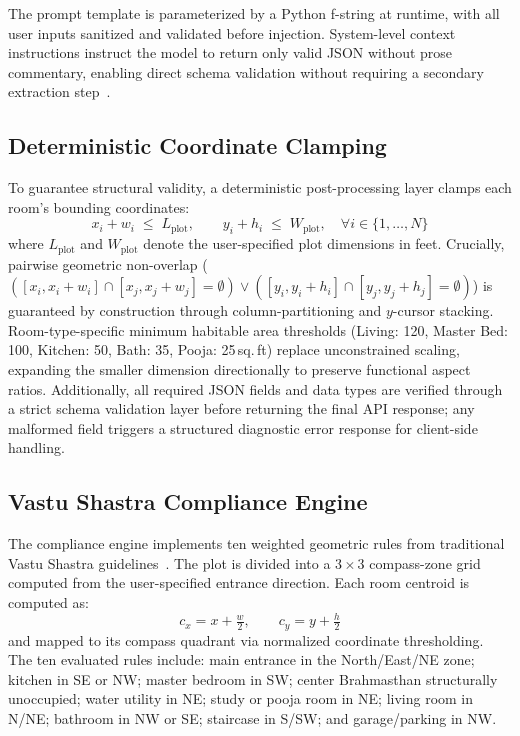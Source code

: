 \documentclass[10pt, twocolumn, letterpaper]{article}
\begin{document}
The prompt template is parameterized by a Python f-string at runtime, with
all user inputs sanitized and validated before injection. System-level context
instructions instruct the model to return only valid JSON without prose
commentary, enabling direct schema validation without requiring a secondary
extraction step~\cite{efficient_guided_gen}.

\subsection{Deterministic Coordinate Clamping}

To guarantee structural validity, a deterministic post-processing layer clamps each room's bounding coordinates:
\begin{equation}
  x_i + w_i \;\leq\; L_{\text{plot}}, \qquad y_i + h_i \;\leq\; W_{\text{plot}}, \quad \forall i \in \{1, \dots, N\}
\end{equation}
where $L_{\text{plot}}$ and $W_{\text{plot}}$ denote the user-specified plot dimensions in feet. Crucially, pairwise geometric non-overlap ($\left([x_i, x_i + w_i] \cap [x_j, x_j + w_j] = \emptyset\right) \lor \left([y_i, y_i + h_i] \cap [y_j, y_j + h_j] = \emptyset\right)$) is guaranteed by construction through column-partitioning and $y$-cursor stacking. Room-type-specific minimum habitable area thresholds (Living: 120, Master Bed: 100, Kitchen: 50, Bath: 35, Pooja: 25\,sq.\,ft) replace unconstrained scaling, expanding the smaller dimension directionally to preserve functional aspect ratios. Additionally, all required JSON fields and data types are verified through a strict schema validation layer before returning the final API response; any malformed field triggers a structured diagnostic error response for client-side handling.

\subsection{Vastu Shastra Compliance Engine}

The compliance engine implements ten weighted geometric rules from traditional
Vastu Shastra guidelines~\cite{vastu_science}. The plot is divided into a
$3{\times}3$ compass-zone grid computed from the user-specified entrance
direction. Each room centroid is computed as:
\begin{equation}
  c_x = x + \tfrac{w}{2}, \qquad c_y = y + \tfrac{h}{2}
\end{equation}
and mapped to its compass quadrant via normalized coordinate thresholding.
The ten evaluated rules include: main entrance in the North/East/NE zone;
kitchen in SE or NW; master bedroom in SW; center Brahmasthan structurally
unoccupied; water utility in NE; study or pooja room in NE; living room
in N/NE; bathroom in NW or SE; staircase in S/SW; and garage/parking in NW.
\end{document}

